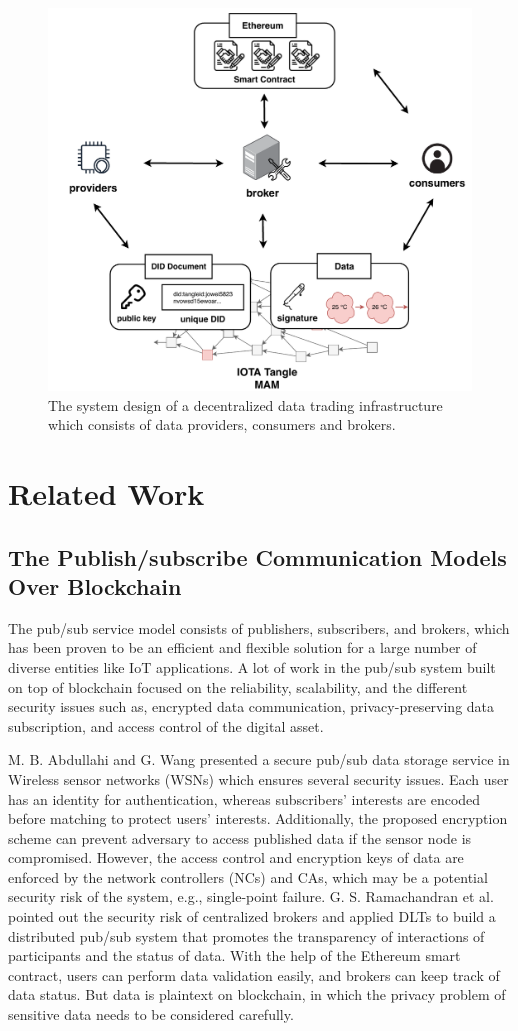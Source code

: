 \documentclass[conference]{IEEEtran}
\begin{document}
\begin{figure}[!t]
    \centering
    \includegraphics[width=3.in]{system_design}
    \caption{The system design of a decentralized data trading infrastructure which consists of data providers, consumers and brokers.}
    \label{fig:system_design}
\end{figure}

\section{Related Work}
\label{section:relatedWork}
\subsection{The Publish/subscribe Communication Models Over Blockchain}
The pub/sub service model consists of publishers, subscribers, and brokers, which has been proven\cite{pubSubAnalysis, pubSubAnalysis2} to be an efficient and flexible solution for a large number of diverse entities like IoT applications. A lot of work in the pub/sub system built on top of blockchain focused on the reliability, scalability, and the different security issues such as, encrypted data communication, privacy-preserving data subscription, and access control of the digital asset.

M. B. Abdullahi and G. Wang\cite{centralPubSub} presented a secure pub/sub data storage service in Wireless sensor networks (WSNs) which ensures several security issues. Each user has an identity for authentication, whereas subscribers' interests are encoded before matching to protect users' interests. Additionally, the proposed encryption scheme can prevent adversary to access published data if the sensor node is compromised. However, the access control and encryption keys of data are enforced by the network controllers (NCs) and CAs, which may be a potential security risk of the system, e.g., single-point failure. G. S. Ramachandran et al.\cite{trinity} pointed out the security risk of centralized brokers and applied DLTs to build a distributed pub/sub system that promotes the transparency of interactions of participants and the status of data. With the help of the Ethereum smart contract, users can perform data validation easily, and brokers can keep track of data status. But data is plaintext on blockchain, in which the privacy problem of sensitive data needs to be considered carefully.
\end{document}
